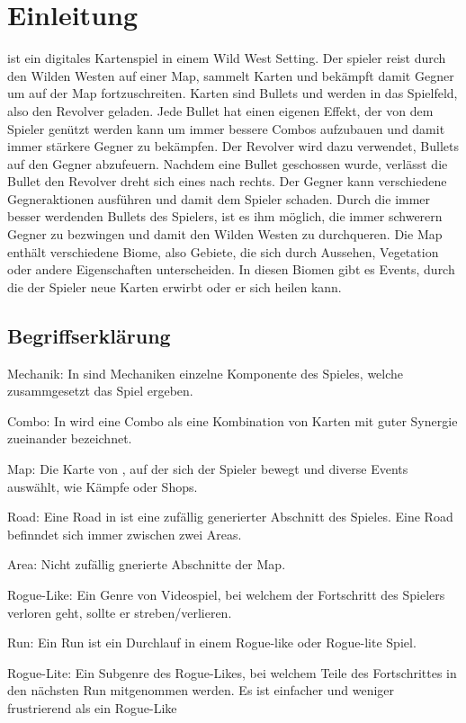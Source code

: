 
\section{Einleitung}\label{sec:einleitung}

\renewcommand{\kapitelautor}{Autor: Philip Jankovic}


\FF ist ein digitales Kartenspiel in einem Wild West Setting. Der spieler reist durch den Wilden Westen auf einer Map,
sammelt Karten und bekämpft damit Gegner um auf der Map fortzuschreiten. Karten sind Bullets und werden in das Spielfeld, also den Revolver geladen.
Jede Bullet hat einen eigenen Effekt, der von dem Spieler genützt werden kann um immer bessere Combos aufzubauen und damit immer stärkere Gegner zu bekämpfen.
Der Revolver wird dazu verwendet, Bullets auf den Gegner abzufeuern. Nachdem eine Bullet geschossen wurde, verlässt die
Bullet den Revolver dreht sich eines nach rechts. Der Gegner kann verschiedene Gegneraktionen ausführen und damit dem Spieler schaden.
Durch die  immer besser werdenden Bullets des Spielers, ist es ihm möglich, die immer schwerern Gegner zu bezwingen und damit den Wilden Westen zu durchqueren.
Die Map enthält verschiedene Biome, also Gebiete, die sich durch Aussehen, Vegetation oder andere Eigenschaften unterscheiden.
In diesen Biomen gibt es Events, durch die der Spieler neue Karten erwirbt oder er sich heilen kann.



\subsection{Begriffserklärung}\label{begriffserklärung}
Mechanik: In \FF sind Mechaniken einzelne Komponente des Spieles, welche zusammgesetzt das Spiel ergeben.

Combo: In \FF wird eine Combo als eine Kombination von Karten mit guter Synergie zueinander bezeichnet.


Map: Die Karte von \FF, auf der sich der Spieler bewegt und diverse Events auswählt, wie \zB Kämpfe oder Shops.

Road: Eine Road in \FF ist eine zufällig generierter Abschnitt des Spieles. Eine Road befinndet sich immer zwischen zwei Areas.

Area: Nicht zufällig gnerierte Abschnitte der \FF Map.

Rogue-Like: Ein Genre von Videospiel, bei welchem der Fortschritt des Spielers verloren geht, sollte er streben/verlieren. 

Run: Ein Run ist ein Durchlauf in einem Rogue-like oder Rogue-lite Spiel. 

Rogue-Lite: Ein Subgenre des Rogue-Likes, bei welchem Teile des Fortschrittes in den nächsten Run mitgenommen werden.
Es ist einfacher und weniger frustrierend als ein Rogue-Like 

%

\renewcommand{\kapitelautor}{}
